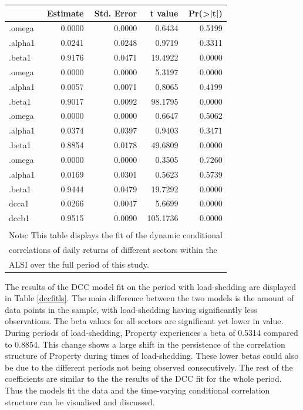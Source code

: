 \documentclass[11pt,preprint, authoryear]{elsarticle}
\let\origtable\table
\let\endorigtable\endtable
\renewenvironment{table}[1][2] {
    \expandafter\origtable\expandafter[H]
} {
    \endorigtable
}
\numberwithin{equation}{section}
\numberwithin{figure}{section}
\numberwithin{table}{section}
\begin{document}
\begin{table}

\caption{\label{tab:dccfitw}DCC Model fit over Full Sample Period \label{dccfitw}}
\centering
\fontsize{9}{11}\selectfont
\begin{tabular}[t]{l|r|r|r|r}
\hline
  &  Estimate &  Std. Error &  t value & Pr(>|t|)\\
\hline
[Financials].omega & 0.0000 & 0.0000 & 0.6434 & 0.5199\\
\hline
[Financials].alpha1 & 0.0241 & 0.0248 & 0.9719 & 0.3311\\
\hline
[Financials].beta1 & 0.9176 & 0.0471 & 19.4922 & 0.0000\\
\hline
[Industrials].omega & 0.0000 & 0.0000 & 5.3197 & 0.0000\\
\hline
[Industrials].alpha1 & 0.0057 & 0.0071 & 0.8065 & 0.4199\\
\hline
[Industrials].beta1 & 0.9017 & 0.0092 & 98.1795 & 0.0000\\
\hline
[Property].omega & 0.0000 & 0.0000 & 0.6647 & 0.5062\\
\hline
[Property].alpha1 & 0.0374 & 0.0397 & 0.9403 & 0.3471\\
\hline
[Property].beta1 & 0.8854 & 0.0178 & 49.6809 & 0.0000\\
\hline
[Resources].omega & 0.0000 & 0.0000 & 0.3505 & 0.7260\\
\hline
[Resources].alpha1 & 0.0169 & 0.0301 & 0.5623 & 0.5739\\
\hline
[Resources].beta1 & 0.9444 & 0.0479 & 19.7292 & 0.0000\\
\hline
[Joint]dcca1 & 0.0266 & 0.0047 & 5.6699 & 0.0000\\
\hline
[Joint]dccb1 & 0.9515 & 0.0090 & 105.1736 & 0.0000\\
\hline
\multicolumn{5}{l}{\textsuperscript{} Note: This table displays the fit of the dynamic conditional}\\
\multicolumn{5}{l}{correlations of daily returns of different sectors within the}\\
\multicolumn{5}{l}{ALSI over the full period of this study.}\\
\end{tabular}
\end{table}

The results of the DCC model fit on the period with load-shedding are
displayed in Table \ref{dccfitls}. The main difference between the two
models is the amount of data points in the sample, with load-shedding
having significantly less observations. The beta values for all sectors
are significant yet lower in value. During periods of load-shedding,
Property experiences a beta of 0.5314 compared to 0.8854. This change
shows a large shift in the persistence of the correlation structure of
Property during times of load-shedding. These lower betas could also be
due to the different periods not being observed consecutively. The rest
of the coefficients are similar to the the results of the DCC fit for
the whole period. Thus the models fit the data and the time-varying
conditional correlation structure can be visualised and discussed.
\end{document}

